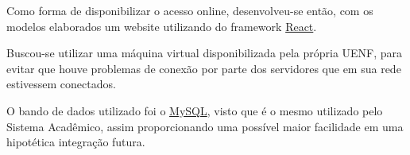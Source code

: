 Como forma de disponibilizar o acesso online, desenvolveu-se então, com os modelos elaborados um website utilizando do framework \href{https://react.dev/}{React}.

Buscou-se utilizar uma máquina virtual disponibilizada pela própria UENF, para evitar que houve problemas de conexão por parte dos servidores que em sua rede estivessem conectados.

O bando de dados utilizado foi o \href{https://dev.mysql.com/}{MySQL}, visto que é o mesmo utilizado pelo Sistema Acadêmico, assim proporcionando uma possível maior facilidade em uma hipotética integração futura.



